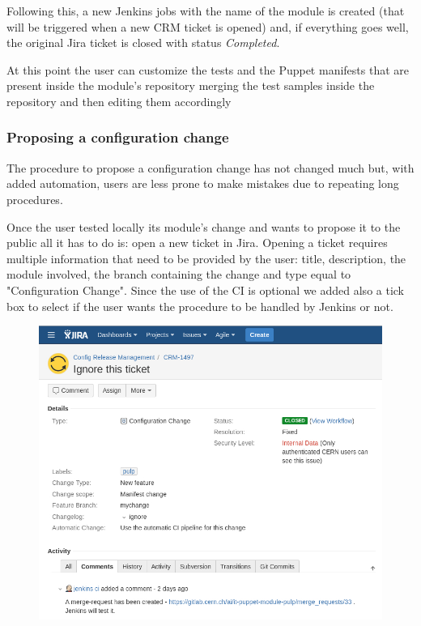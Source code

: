 Following this, a new Jenkins jobs with the name of the module is created
(that will be triggered when a new CRM ticket is opened) and, if
everything goes well, the original Jira ticket is closed with status
\textit{Completed}. 

At this point the user can customize the tests and the Puppet manifests
that are present inside the module's repository merging the test samples
inside the repository and then editing them accordingly 

\subsubsection{Proposing a configuration change}

The procedure to propose a configuration change has not changed much but,
with added automation, users are less prone to make mistakes due to
repeating long procedures.

Once the user tested locally its module's change and wants to propose it
to the public all it has to do is: open a new ticket in Jira. Opening
a ticket requires multiple information that need to be provided by the
user: title, description, the module involved, the branch containing the
change and type equal to "Configuration Change". Since the use of the CI
is optional we added also a tick box to select if the user wants the
procedure to be handled by Jenkins or not.

\begin{figure}[H]
\includegraphics[width=\textwidth,height=\textheight,keepaspectratio]{ContinuousIntegrationWithJenkins/images/add_crm_change.jpg}
\end{figure}

